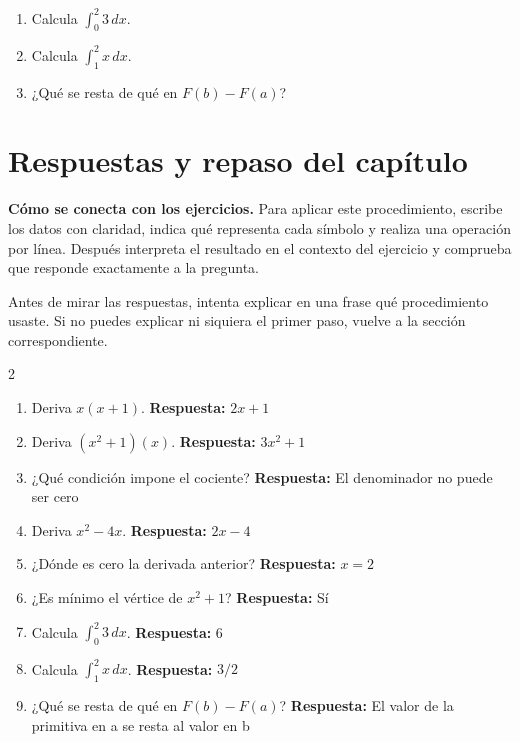 \documentclass[10pt,oneside,openany]{book}
\begin{document}
\begin{practica}

\begin{enumerate}

\item Calcula $\int_0^2 3\,dx$.

\item Calcula $\int_1^2 x\,dx$.

\item ¿Qué se resta de qué en $F(b)-F(a)$?

\end{enumerate}

\end{practica}



\section{Respuestas y repaso del capítulo}

\textbf{Cómo se conecta con los ejercicios.} Para aplicar este procedimiento, escribe los datos con claridad, indica qué representa cada símbolo y realiza una operación por línea. Después interpreta el resultado en el contexto del ejercicio y comprueba que responde exactamente a la pregunta.

Antes de mirar las respuestas, intenta explicar en una frase qué procedimiento usaste. Si no puedes explicar ni siquiera el primer paso, vuelve a la sección correspondiente.

\begin{multicols}{2}\begin{enumerate}

\item Deriva $x(x+1)$. \textbf{Respuesta:} $2x+1$

\item Deriva $(x^2+1)(x)$. \textbf{Respuesta:} $3x^2+1$

\item ¿Qué condición impone el cociente? \textbf{Respuesta:} El denominador no puede ser cero

\item Deriva $x^2-4x$. \textbf{Respuesta:} $2x-4$

\item ¿Dónde es cero la derivada anterior? \textbf{Respuesta:} $x=2$

\item ¿Es mínimo el vértice de $x^2+1$? \textbf{Respuesta:} Sí

\item Calcula $\int_0^2 3\,dx$. \textbf{Respuesta:} 6

\item Calcula $\int_1^2 x\,dx$. \textbf{Respuesta:} $3/2$

\item ¿Qué se resta de qué en $F(b)-F(a)$? \textbf{Respuesta:} El valor de la primitiva en a se resta al valor en b

\end{enumerate}\end{multicols}
\end{document}
